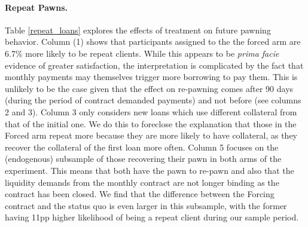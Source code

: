 \documentclass[oneside,11pt]{article}
\begin{document}
\paragraph{Repeat Pawns.}
Table \ref{repeat_loans} explores the effects of treatment on future pawning behavior.
Column (1) shows that participants assigned to the the forced arm are 6.7\% more likely to be repeat clients. %
While this appears to be \emph{prima facie} evidence of greater satisfaction, the interpretation is complicated by the fact that monthly payments may themselves trigger more borrowing to pay them. This is unlikely to be the case given that the effect on re-pawning comes after 90 days (during the period of contract demanded payments) and not before  (see columns 2 and 3). Column 3 only considers new loans which use different collateral from that of the initial one. We do this to foreclose the explanation that those in the Forced arm repeat more because they are more likely to have collateral, as they recover the collateral of the first loan more often.  Column 5 focuses on the (endogenous) subsample of those recovering their pawn in both arms of the experiment. This means that both have the pawn to re-pawn and also that the liquidity demands from the monthly contract are not longer binding as the contract has been closed. We find that the difference between the Forcing contract and the status quo is even larger in this subsample, with the former having 11pp higher likelihood of being a repeat client during our sample period.
\end{document}
